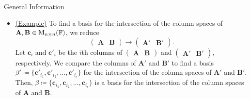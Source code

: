 \documentclass[../Notes.tex]{subfiles}
\begin{document}
\begin{stbox}{General Information}
\begin{itemize}
        \item \href{https://math.stackexchange.com/a/802878}{(Example)} To find a basis for the intersection of the column spaces of \(\mathbf{A},\mathbf{B}\in\operatorname{M}_{n \times n}(\mathbb{F})\), we reduce
        \[\begin{pmatrix}
            \mathbf{A}&\mathbf{B}
        \end{pmatrix}\to
        \begin{pmatrix}
            \mathbf{A'}&\mathbf{B'}
        \end{pmatrix}.\]
        Let \(\mathbf{c}_i\) and \(\mathbf{c'}_i\) be the \(i\)th columns of 
        \(\begin{pmatrix}
            \mathbf{A}&\mathbf{B}
        \end{pmatrix}\) and
        \(\begin{pmatrix}
            \mathbf{A'}&\mathbf{B'}
        \end{pmatrix}\), respectively.
        We compare the columns of \(\mathbf{A'}\) and \(\mathbf{B'}\) to find a basis \(\beta'\coloneq\{\mathbf{c}'_{i_1},\mathbf{c}'_{i_2},\dots,\mathbf{c}'_{i_r}\}\) for the intersection of the column spaces of \(\mathbf{A'}\) and \(\mathbf{B'}\). Then, \(\beta\coloneq\{\mathbf{c}_{i_1},\mathbf{c}_{i_2},\dots,\mathbf{c}_{i_r}\}\) is a basis for the intersection of the column spaces of \(\mathbf{A}\) and \(\mathbf{B}\).

\end{itemize}
\end{stbox}
\end{document}
